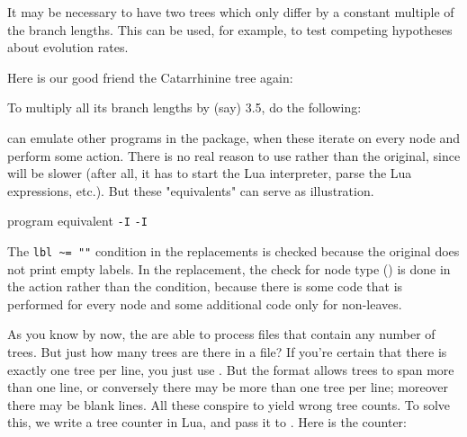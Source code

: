 
\page[no]

It may be necessary to have two trees which only differ by a constant multiple
of the branch lengths. This can be used, for example, to test competing
hypotheses about evolution rates.

Here is our good friend the Catarrhinine tree again:


To multiply all its branch lengths by (say) 3.5, do the following:



\luaed{} can emulate other programs in the package, when these
iterate on every node and perform some action. There is no real reason to use
\luaed{} rather than the original, since \luaed{} will be slower (after all, it
has to start the Lua interpreter, parse the Lua expressions, etc.). But these
"equivalents" can serve as illustration.

\startalignment[center]
\starttabulate[|l|l|]
\NC	program \NC \luaed{} equivalent \NC\NR
\HL
\NC {} 						  \NC\NR
\NC {} {\tt -I} 		 \NC\NR
\NC \topology{}						 \NC\NR
\NC \topology{} {\tt -I} 	 \NC\NR
\stoptabulate
\stopalignment

The {\tt lbl \~{}= ""} condition in the  replacements is checked
because the original  does not print empty labels. In the \topology{}
replacement, the check for node type () is done in the action rather
than the condition, because there is some code that is performed for every node
and some additional code only for non-leaves. 


As you know by now, the \nutils{} are able to process files that contain any
number of trees. But just how many trees are there in a file? If you're certain
that there is exactly one tree per line, you just use . But the
\nw{} format allows trees to span more than one line, or conversely there may be
more than one tree per line; moreover there may be blank lines. All these
conspire to yield wrong tree counts. To solve this, we write a tree counter in
Lua, and pass it to \luaed. Here is the counter:

